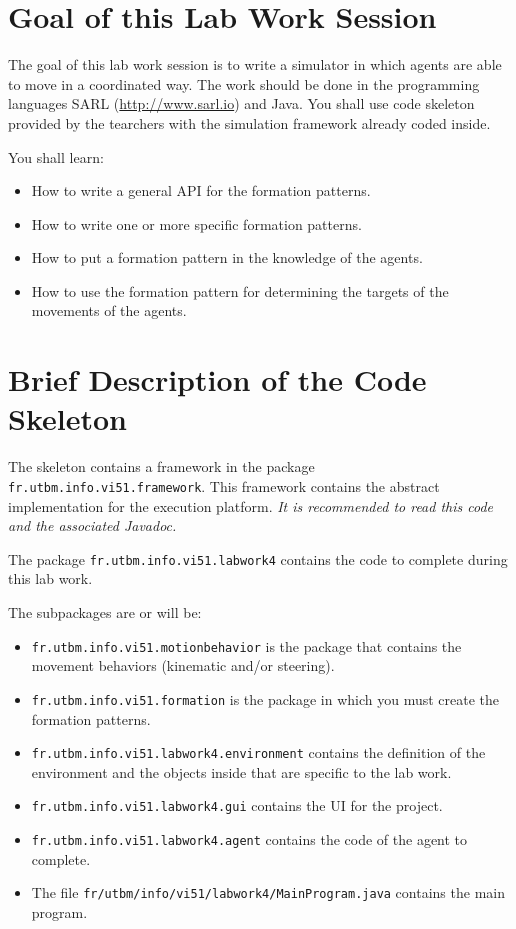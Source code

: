 \documentclass[article,english,nodocumentinfo]{multiagentfrreport}
\begin{document}
\section{Goal of this Lab Work Session}

The goal of this lab work session is to write a simulator in which agents are able to move in a coordinated way.
The work should be done in the programming languages SARL (\url{http://www.sarl.io}) and Java.
You shall use code skeleton provided by the tearchers with the simulation framework already coded inside.

You shall learn: 
\begin{itemize}
\item How to write a general API for the formation patterns.
\item How to write one or more specific formation patterns.
\item How to put a formation pattern in the knowledge of the agents.
\item How to use the formation pattern for determining the targets of the movements of the agents. 
\end{itemize}



\section{Brief Description of the Code Skeleton}

The skeleton contains a framework in the package \texttt{fr.utbm.info.vi51.framework}.
This framework contains the abstract implementation for the execution platform.
\emph{It is recommended to read this code and the associated Javadoc.}

The package \texttt{fr.utbm.info.vi51.labwork4} contains the code to complete during this lab work.

The subpackages are or will be:
\begin{itemize}
\item \texttt{fr.utbm.info.vi51.motionbehavior} is the package that contains the movement behaviors (kinematic and/or steering).
\item \texttt{fr.utbm.info.vi51.formation} is the package in which you must create the formation patterns.
\item \texttt{fr.utbm.info.vi51.labwork4.environment} contains the definition of the environment and the objects inside that are specific to the lab work.
\item \texttt{fr.utbm.info.vi51.labwork4.gui} contains the UI for the project.
\item \texttt{fr.utbm.info.vi51.labwork4.agent} contains the code of the agent to complete.
\item The file \texttt{fr/utbm/info/vi51/labwork4/MainProgram.java} contains the main program.
\end{itemize}
\end{document}
